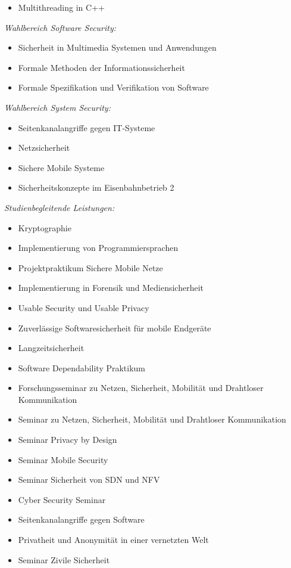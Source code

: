 {\begin{itemize}[noitemsep]
        \item Multithreading in C++
    \end{itemize}
    \textit{Wahlbereich Software Security:}
    \begin{itemize}[noitemsep]
        \item Sicherheit in Multimedia Systemen und Anwendungen
        \item Formale Methoden der Informationssicherheit
        \item Formale Spezifikation und Verifikation von Software
    \end{itemize}
    \textit{Wahlbereich System Security:}
    \begin{itemize}[noitemsep]
        \item Seitenkanalangriffe gegen IT-Systeme
        \item Netzsicherheit
        \item Sichere Mobile Systeme
        \item Sicherheitskonzepte im Eisenbahnbetrieb 2
    \end{itemize}
    \textit{Studienbegleitende Leistungen:}
    \begin{itemize}[noitemsep]
        \item Kryptographie
        \item Implementierung von Programmiersprachen
        \item Projektpraktikum Sichere Mobile Netze
        \item Implementierung in Forensik und Mediensicherheit
        \item Usable Security und Usable Privacy
        \item Zuverlässige Softwaresicherheit für mobile Endgeräte
        \item Langzeitsicherheit
        \item Software Dependability Praktikum
        \item Forschungsseminar zu Netzen, Sicherheit, Mobilität und Drahtloser Kommunikation
        \item Seminar zu Netzen, Sicherheit, Mobilität und Drahtloser Kommunikation
        \item Seminar Privacy by Design
        \item Seminar Mobile Security
        \item Seminar Sicherheit von SDN und NFV
        \item Cyber Security Seminar
        \item Seitenkanalangriffe gegen Software
        \item Privatheit und Anonymität in einer vernetzten Welt
        \item Seminar Zivile Sicherheit
    \end{itemize}

}
